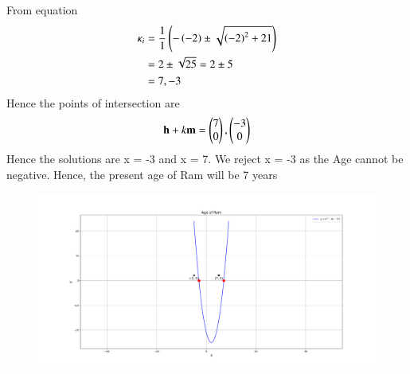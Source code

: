 \documentclass[journal]{IEEEtran}
\begin{document}
From equation 
\begin{align}
\kappa_i&= \frac{1}{1}\left(-\left(-2\right)\pm\sqrt{\left(-2\right)^2+21}\right)\\
&=2\pm\sqrt{25}=2\pm5 \\
&=7,-3
\end{align}
Hence the points of intersection are
\begin{align}
\mathbf{h}+k\mathbf{m}=\begin{pmatrix}7\\0\end{pmatrix},\begin{pmatrix}-3\\0\end{pmatrix}
\end{align}
Hence the solutions are x = -3 and x = 7. We reject
x = -3 as the Age cannot be negative. Hence, the present age of Ram will be 7 years
\begin{figure}[h]
   \centering
   \includegraphics[width=0.9\columnwidth]{figs/fig1.png}
	\caption{}
   \label{}
\end{figure}
\end{document}
